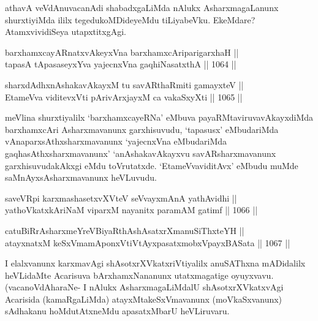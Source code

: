 \begin{artha}
athavA veVdAnuvacanAdi shabadxgaLiMda nAlukx AsharxmagaLanunx shurxtiyiMda ililx tegedukoMDideyeMdu tiLiyabeVku. EkeMdare? AtamxvividiSeya utapxtitxgAgi.
\end{artha}


\begin{shl}
barxhamxcayARnatxvAkeyxVna barxhamxcAriparigarxhaH || \\
tapasA tApasaseyxYva yajecnxVna gaqhiNasatxthA \hfill || 1064 ||  
\end{shl}
				
\begin{shl}
sharxdAdhxnAshakavAkayxM tu savARthaRmiti gamayxteV ||  \\
EtameVva viditevxVti pArivArxjayxM ca vakaSxyXti \hfill || 1065 ||  
\end{shl}

\begin{artha}
meVlina shurxtiyalilx `barxhamxcayeRNa' eMbuva payaRMtaviruvavAkayxdiMda barxhamxcAri Asharxmavanunx garxhisuvudu, `tapasusx' eMbuda\-riMda vAnaparxsAthxsharxmavanunx `yajecnxVna eMbudariMda gaqhasAthxsharxmavanunx' `anAshakavAkayxvu savARsharxmavanunx garxhisuvudakAkxgi eMdu toVrutatxde. `EtameVvaviditAvx' eMbudu muMde saMnAyxsAsharxmavanunx heVLuvudu.
\end{artha}


\begin{shl}
saveVR\s pi karxmashasetxvXVteV seVvayxmAnA yathAvidhi || \\
yathoVkatxkAriNaM viparxM nayanitx paramAM gatimf \hfill || 1066 ||  
\end{shl}
				
\begin{shl}
catuBiRrAsharxmeYreVBiyaRthAshAsatxrXmanuSiThxteYH || \\
atayxnatxM keSxVmamAponxVtiVtAyxpasatxmobxV\s payxBASata \hfill || 1067 ||  
\end{shl}

\begin{artha}
I elalxvanunx karxmavAgi shAsotxrXVkatxriVtiyalilx anuSAThxna mADidalilx heVLidaMte Acarisuva bArxhamxNananunx utatxmagatige oyuyxvavu. (vacanoVdAharaNe- I nAlukx AsharxmagaLiMdalU shAsotxrXVkatxvAgi Acarisida (kamaRgaLiMda) atayxMtakeSxVmavanunx (moVkaSxvanunx) sAdhakanu hoMdutAtxneMdu apasatxMbarU heVLiruvaru.
\end{artha}


